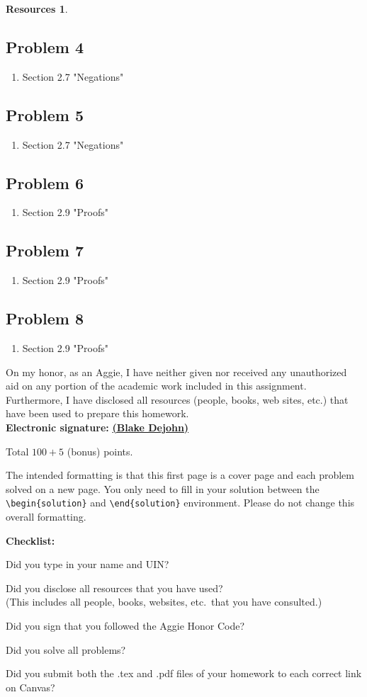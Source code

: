 \documentclass{article}
\theoremstyle{definition}
\newtheorem*{solution}{Solution}
\newtheorem*{resources}{Resources}
\newcommand{\honor}{\noindent On my honor, as an Aggie, I have neither
  given nor received any unauthorized aid on any portion of the
  academic work included in this assignment. Furthermore, I have
  disclosed all resources (people, books, web sites, etc.) that have
  been used to prepare this homework. \\[2ex]
 \textbf{Electronic signature:} \underline{ \textbf{(Blake Dejohn)} } } %
\newcommand{\checklist}{\noindent\textbf{Checklist:}
\begin{compactitem}[$\Box$] 
\item [\checkmark] Did you type in your name and UIN? 
\item [\checkmark] Did you disclose all resources that you have used? \\
(This includes all people, books, websites, etc.\ that you have consulted.)
\item [\checkmark] Did you sign that you followed the Aggie Honor Code? 
\item [\checkmark] Did you solve all problems? 
\item [\checkmark] Did you submit both the .tex and .pdf files of your homework to each correct link on Canvas? 
\end{compactitem}
}
\begin{document}
\begin{resources}
\subsection*{Problem 4}
\begin{enumerate}
\item Section 2.7 "Negations"
\end{enumerate}
\subsection*{Problem 5}
\begin{enumerate}
\item Section 2.7 "Negations"
\end{enumerate}
\subsection*{Problem 6}
\begin{enumerate}
\item Section 2.9 "Proofs"
\end{enumerate}
\subsection*{Problem 7}
\begin{enumerate}
\item Section 2.9 "Proofs"
\end{enumerate}
\subsection*{Problem 8}
\begin{enumerate}
\item Section 2.9 "Proofs"
\end{enumerate}
\end{resources}
\honor

\bigskip

\noindent
Total $100 + 5$ (bonus) points.

\bigskip

\noindent
The intended formatting is that this first page is a cover page and each 
problem solved on a new page. You only need to fill in your solution between 
the \verb|\begin{solution}| and \verb|\end{solution}| environment.  
Please do not change this overall formatting.

\vfill
\checklist
\end{document}
